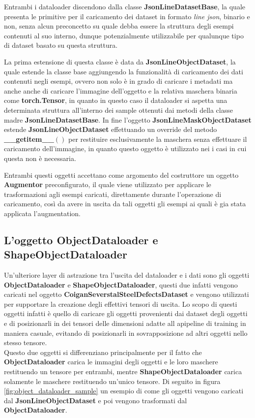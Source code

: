Entrambi i dataloader discendono dalla classe \textbf{JsonLineDatasetBase}, la quale presenta le primitive per il caricamento dei dataset in formato \textit{line json},
binario e non, senza alcun preconcetto su quale debba essere la struttura degli esempi contenuti al suo interno, dunque potenzialmente utilizzabile per qualunque tipo di dataset
basato su questa struttura.

La prima estensione di questa classe è data da \textbf{JsonLineObjectDataset}, la quale estende la classe base aggiungendo la funzionalità di caricamento
dei dati contenuti negli esempi, ovvero non solo è in grado di caricare i metadati ma anche anche di caricare l'immagine dell'oggetto e la relativa maschera binaria come \textbf{torch.Tensor},
in quanto in questo caso il dataloader si aspetta una determinata struttura all'interno dei sample ottenuti dai metodi della classe madre \textbf{JsonLineDatasetBase}.
In fine l'oggetto \textbf{JsonLineMaskObjectDataset} estende \textbf{JsonLineObjectDataset} effettuando un override del metodo \textbf{\_\_getitem\_\_$()$} per restituire esclusivamente la maschera
senza effettuare il caricamento dell'immagine, in quanto questo oggetto è utilizzato nei i casi in cui questa non è necessaria.

Entrambi questi oggetti accettano come argomento del costruttore un oggetto \textbf{Augmentor} preconfigurato, il quale viene utilizzato per applicare le trasformazioni
agli esempi caricati, direttamente durante l'operazione di caricamento, così da avere in uscita da tali oggetti gli esempi ai quali è gia stata applicata l'augmentation.



\subsection{L'oggetto ObjectDataloader e ShapeObjectDataloader}
Un'ulteriore layer di astrazione tra l'uscita del dataloader e i dati sono gli oggetti \textbf{ObjectDataloader} e \textbf{ShapeObjectDataloader}, questi due infatti
vengono caricati nel oggetto \textbf{CoiganSeverstalSteelDefectsDataset} e vengono utilizzati per supportare la creazione degli effettivi tensori di uscita.
Lo scopo di questi oggetti infatti è quello di caricare gli oggetti provenienti dai dataset degli oggetti e di posizionarli in dei tensori delle dimensioni adatte all apipeline di training
in maniera casuale, evitando di posizionarli in sovrapposizione ad altri oggetti nello stesso tensore.\\
Questo due oggetti si differenziano principalmente per il fatto che \textbf{ObjectDataloader} carica le immagini degli oggetti e le loro maschere restituendo un tensore per entrambi, mentre 
\textbf{ShapeObjectDataloader} carica solamente le maschere restituendo un'unico tensore.
Di seguito in figura \ref{fig:object_dataloader_sample} un esempio di come gli oggetti vengono caricati dal \textbf{JsonLineObjectDataset} e poi vengono trasformati dal \textbf{ObjectDataloader}.

